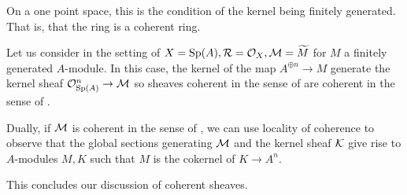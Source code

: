 \begin{remark}
    On a one point space, this is the condition of the kernel being finitely generated. That is, that the ring is a coherent ring. 
\end{remark}
\begin{example}
    Let us consider  in the setting of $X=\mathrm{Sp}(A),\mathcal{R}=\mathcal{O}_{X},\mathcal{M}=\widetilde{M}$ for $M$ a finitely generated $A$-module. In this case, the kernel of the map $A^{\oplus n}\to M$ generate the kernel sheaf $\mathcal{O}_{\mathrm{Sp}(A)}^{n}\to\mathcal{M}$ so sheaves coherent in the sense of  are coherent in the sense of . 

    Dually, if $\mathcal{M}$ is coherent in the sense of , we can use locality of coherence  to observe that the global sections generating $\mathcal{M}$ and the kernel sheaf $\mathcal{K}$ give rise to $A$-modules $M,K$ such that $M$ is the cokernel of $K\to A^{n}$. 
\end{example}
This concludes our discussion of coherent sheaves.